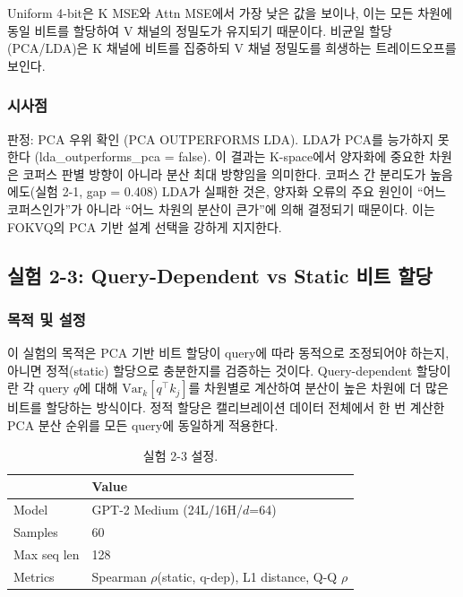 \documentclass[11pt,a4paper]{article}
\begin{document}
Uniform 4-bit은 K MSE와 Attn MSE에서 가장 낮은 값을 보이나, 이는 모든 차원에 동일 비트를 할당하여 V 채널의 정밀도가 유지되기 때문이다.
비균일 할당(PCA/LDA)은 K 채널에 비트를 집중하되 V 채널 정밀도를 희생하는 트레이드오프를 보인다.

\subsubsection{시사점}

판정: \textcolor{success}{PCA 우위 확인 (PCA OUTPERFORMS LDA)}.
LDA가 PCA를 능가하지 못한다 (lda\_outperforms\_pca = false).
이 결과는 K-space에서 양자화에 중요한 차원은 코퍼스 판별 방향이 아니라 분산 최대 방향임을 의미한다.
코퍼스 간 분리도가 높음에도(실험 2-1, gap = 0.408) LDA가 실패한 것은, 양자화 오류의 주요 원인이 ``어느 코퍼스인가''가 아니라 ``어느 차원의 분산이 큰가''에 의해 결정되기 때문이다.
이는 FOKVQ의 PCA 기반 설계 선택을 강하게 지지한다.

\subsection{실험 2-3: Query-Dependent vs Static 비트 할당}

\subsubsection{목적 및 설정}

이 실험의 목적은 PCA 기반 비트 할당이 query에 따라 동적으로 조정되어야 하는지, 아니면 정적(static) 할당으로 충분한지를 검증하는 것이다.
Query-dependent 할당이란 각 query $q$에 대해 $\mathrm{Var}_{k}[q^\top k_j]$를 차원별로 계산하여 분산이 높은 차원에 더 많은 비트를 할당하는 방식이다.
정적 할당은 캘리브레이션 데이터 전체에서 한 번 계산한 PCA 분산 순위를 모든 query에 동일하게 적용한다.

\begin{table}[H]
\centering
\caption{실험 2-3 설정.}
\label{tab:exp23_setup}
\begin{tabular}{ll}
\toprule
\textbf{} & \textbf{Value} \\
\midrule
Model & GPT-2 Medium (24L/16H/$d$=64) \\
Samples & 60 \\
Max seq len & 128 \\
Metrics & Spearman $\rho$(static, q-dep), L1 distance, Q-Q $\rho$ \\
\bottomrule
\end{tabular}
\end{table}
\end{document}
